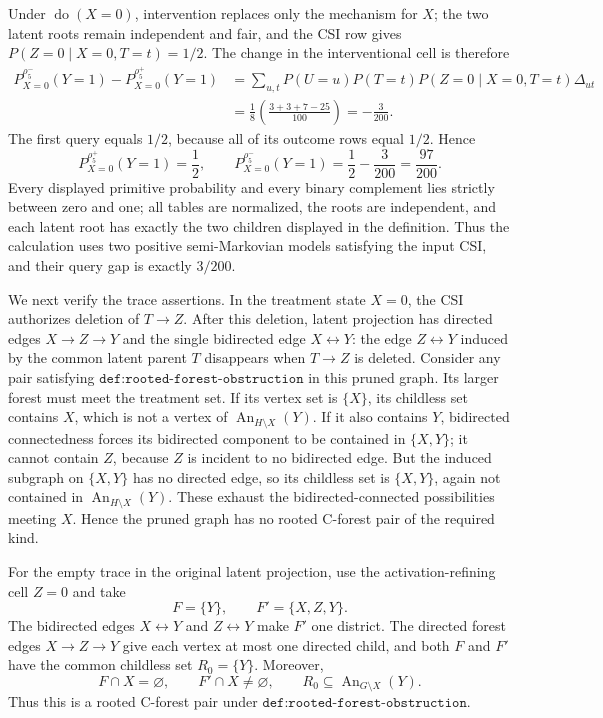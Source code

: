 Under \(\operatorname{do}(X=0)\), intervention replaces only the mechanism for \(X\); the two latent roots remain independent and fair, and the CSI row gives \(P(Z=0\mid X=0,T=t)=1/2\).  The change in the interventional cell is therefore
\[
 \begin{aligned}
 P_{X=0}^{\rho^-_5}(Y=1)-P_{X=0}^{\rho^+_5}(Y=1)
 &=\sum_{u,t}P(U=u)P(T=t)P(Z=0\mid X=0,T=t)\Delta_{ut}\\
 &=\frac18\left(\frac{3+3+7-25}{100}\right)
 =-\frac3{200}.
 \end{aligned}
\]
The first query equals \(1/2\), because all of its outcome rows equal \(1/2\).  Hence
\[
 P_{X=0}^{\rho^+_5}(Y=1)=\frac12,
 \qquad
 P_{X=0}^{\rho^-_5}(Y=1)=\frac12-\frac3{200}=\frac{97}{200}.
\]
Every displayed primitive probability and every binary complement lies strictly between zero and one; all tables are normalized, the roots are independent, and each latent root has exactly the two children displayed in the definition.  Thus the calculation uses two positive semi-Markovian models satisfying the input CSI, and their query gap is exactly \(3/200\).

We next verify the trace assertions.  In the treatment state \(X=0\), the CSI authorizes deletion of \(T\to Z\).  After this deletion, latent projection has directed edges \(X\to Z\to Y\) and the single bidirected edge \(X\leftrightarrow Y\): the edge \(Z\leftrightarrow Y\) induced by the common latent parent \(T\) disappears when \(T\to Z\) is deleted.  Consider any pair satisfying \(\texttt{def:rooted-forest-obstruction}\) in this pruned graph.  Its larger forest must meet the treatment set.  If its vertex set is \(\{X\}\), its childless set contains \(X\), which is not a vertex of \(\operatorname{An}_{H\setminus X}(Y)\).  If it also contains \(Y\), bidirected connectedness forces its bidirected component to be contained in \(\{X,Y\}\); it cannot contain \(Z\), because \(Z\) is incident to no bidirected edge.  But the induced subgraph on \(\{X,Y\}\) has no directed edge, so its childless set is \(\{X,Y\}\), again not contained in \(\operatorname{An}_{H\setminus X}(Y)\).  These exhaust the bidirected-connected possibilities meeting \(X\).  Hence the pruned graph has no rooted C-forest pair of the required kind.

For the empty trace in the original latent projection, use the activation-refining cell \(Z=0\) and take
\[
 F=\{Y\},\qquad F'=\{X,Z,Y\}.
\]
The bidirected edges \(X\leftrightarrow Y\) and \(Z\leftrightarrow Y\) make \(F'\) one district.  The directed forest edges \(X\to Z\to Y\) give each vertex at most one directed child, and both \(F\) and \(F'\) have the common childless set \(R_0=\{Y\}\).  Moreover,
\[
 F\cap X=\varnothing,
 \qquad
 F'\cap X\ne\varnothing,
 \qquad
 R_0\subseteq\operatorname{An}_{G\setminus X}(Y).
\]
Thus this is a rooted C-forest pair under \(\texttt{def:rooted-forest-obstruction}\).

